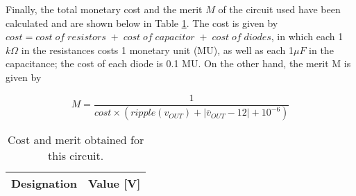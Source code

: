 Finally, the total monetary cost and the merit $M$ of the circuit used have been calculated and are shown below in Table \ref{tab:rip}. The cost is given by $cost=cost\; of\; resistors\; +\; cost\; of\; capacitor\; +\; cost\; of\; diodes$, in which each 1$k\Omega$ in the resistances costs 1 monetary unit (MU), as well as each 1$\mu F$ in the capacitance; the cost of each diode is 0.1 MU. On the other hand, the  merit M is given by

\begin{equation} \label{eq:merit}
  M=\frac{1}{cost\times (ripple(v_{OUT})+|\overline{v}_{OUT}-12|+10^{-6})} 
\end{equation}


\begin{table}[H]
  \centering
  \begin{tabular}{|c|c|}
    \hline
        {\bf Designation} & {\bf Value [V]} \\ \hline
        
  \end{tabular}
  \caption{Cost and merit obtained for this circuit.} 
  \label{tab:rip}
\end{table}

